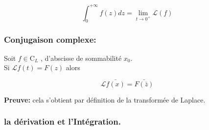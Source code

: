 \documentclass[12pt,a4paper]{report}
\begin{document}
\begin{displaymath}
  \int_{0}^{+\infty} f(z) dz= \lim_{t\rightarrow 0^{+}} \mathcal{L}(f)
\end{displaymath}

\subsubsection{ Conjugaison complexe:}

Soit $f \in \mathrm{C}_{L}$ , d'abscisse de sommabilité $x_0$.\\
Si $\mathcal{L}f(t) = F(z)$ alors

     \begin{displaymath}
       \mathcal{L} \bar{f(x)}= \bar{F(\bar{z})} 
      \end{displaymath}
   
\textbf{Preuve:} cela s'obtient par définition de la transformée de Laplace.\\

\subsubsection{ la dérivation et l'Intégration.}  
\end{document}
